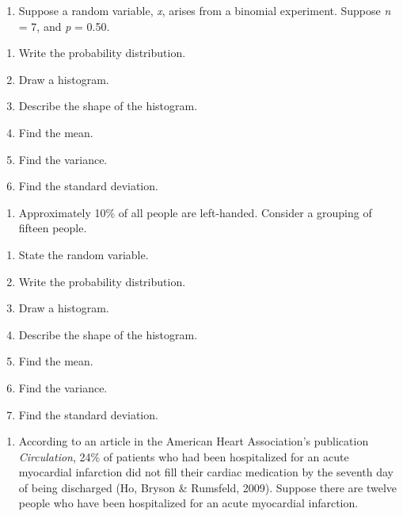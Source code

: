 \documentclass[
]{book}
\providecommand{\tightlist}{%
  \setlength{\itemsep}{0pt}\setlength{\parskip}{0pt}}
\begin{document}
\begin{enumerate}
\def\labelenumi{\arabic{enumi}.}
\setcounter{enumi}{2}
\tightlist
\item
  Suppose a random variable, \emph{x}, arises from a binomial experiment. Suppose \emph{n} = 7, and \emph{p} = 0.50.
\end{enumerate}

\begin{enumerate}
\def\labelenumi{\alph{enumi}.}
\tightlist
\item
  Write the probability distribution.
\item
  Draw a histogram.
\item
  Describe the shape of the histogram.
\item
  Find the mean.
\item
  Find the variance.
\item
  Find the standard deviation.
\end{enumerate}

\begin{enumerate}
\def\labelenumi{\arabic{enumi}.}
\setcounter{enumi}{3}
\tightlist
\item
  Approximately 10\% of all people are left-handed. Consider a grouping of fifteen people.
\end{enumerate}

\begin{enumerate}
\def\labelenumi{\alph{enumi}.}
\tightlist
\item
  State the random variable.
\item
  Write the probability distribution.
\item
  Draw a histogram.
\item
  Describe the shape of the histogram.
\item
  Find the mean.
\item
  Find the variance.
\item
  Find the standard deviation.
\end{enumerate}

\begin{enumerate}
\def\labelenumi{\arabic{enumi}.}
\setcounter{enumi}{4}
\tightlist
\item
  According to an article in the American Heart Association's publication \emph{Circulation}, 24\% of patients who had been hospitalized for an acute myocardial infarction did not fill their cardiac medication by the seventh day of being discharged (Ho, Bryson \& Rumsfeld, 2009). Suppose there are twelve people who have been hospitalized for an acute myocardial infarction.
\end{enumerate}
\end{document}
